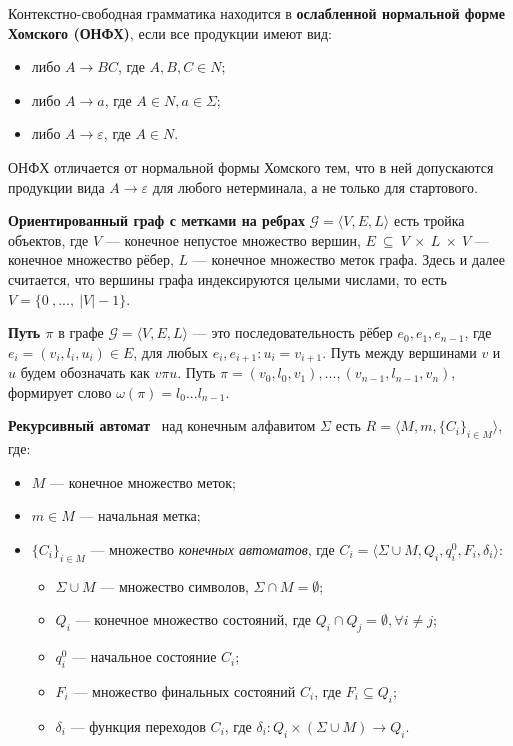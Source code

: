Контекстно-свободная грамматика находится в \textbf{ослабленной нормальной форме Хомского (ОНФХ)}, если все продукции имеют вид:
\begin{itemize}
    \item либо $A \to BC$, где $A,B,C \in N$;
    \item либо $A \to a$, где $A \in N, a \in \Sigma$;
    \item либо $A \to \varepsilon$, где $A \in N$.
\end{itemize}

ОНФХ отличается от нормальной формы Хомского тем, что в ней допускаются продукции вида $A \to \varepsilon$ для любого нетерминала, а не только для стартового.

\textbf{Ориентированный граф с метками на ребрах} $\mathcal{G} = \langle V, E, L \rangle$ есть тройка объектов, где $V$ --- конечное непустое множество вершин, $E~\subseteq~V~\times~L~\times~V$ --- конечное множество рёбер, $L$ --- конечное множество меток графа. Здесь и далее считается, что вершины графа индексируются целыми числами, то есть $V = \{0~,...,~|V| - 1\}$.

\textbf{Путь $\pi$} в графе $\mathcal{G} = \langle V, E, L \rangle$ --- это последовательность рёбер $e_0,e_1,e_{n-1}$, где ${e_i = (v_i, l_i, u_i) \in E}$, для любых ${e_i,e_{i+1}:u_i=v_{i+1}}$. Путь между вершинами $v$ и $u$ будем обозначать как $v \pi u$. Путь ${\pi=(v_0,l_0,v_1),...,(v_{n-1}, l_{n-1},v_n)}$, формирует слово $\omega (\pi) = l_0 ... l_{n-1}$.


\textbf{Рекурсивный автомат}~\cite{rsm} над конечным алфавитом $\Sigma$ есть ${R=\langle M,m,\{C_i\}_{i \in M}\rangle}$, где:

\begin{itemize}
    \item $M$ --- конечное множество меток;
    \item $m \in M$ --- начальная метка;
    \item $ \{C_i\}_{i \in M} $ --- множество \textit{конечных автоматов},
          где ${C_i=\langle\Sigma\cup M,Q_i,q_i^0,F_i,\delta_i\rangle}$:
    \begin{itemize}
        \item $\Sigma \cup M$ --- множество символов, $\Sigma \cap M = \emptyset$;
        \item $Q_i$ --- конечное множество состояний,
              где $Q_i \cap Q_j = \emptyset, \forall i \neq j$;
        \item $q_i^0$ --- начальное состояние $C_i$;
        \item $F_i$ --- множество финальных состояний $C_i$, где $F_i \subseteq Q_i$;
        \item $\delta_i$ --- функция переходов $C_i$,
              где $\delta_i: Q_i \times (\Sigma \cup M)
              \to Q_i$.
    \end{itemize}
\end{itemize}

